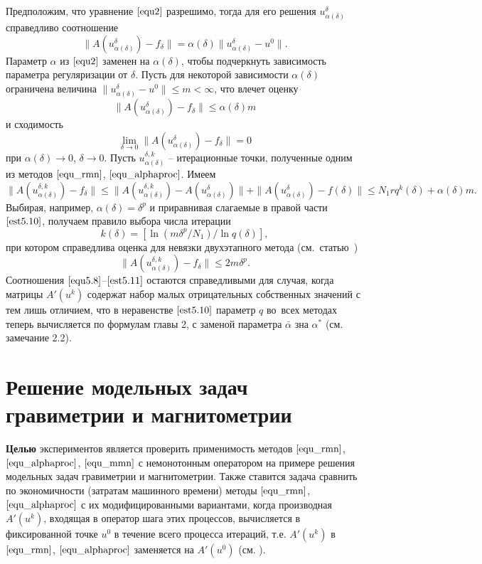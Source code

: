 Предположим, что уравнение $\eqref{equ2}$ разрешимо, тогда для его решения $u_{\alpha(\delta)}^{\delta}$ справедливо соотношение
\begin{equation}\label{equ5.8}
\|A(u_{\alpha(\delta)}^{\delta})-f_\delta\|=\alpha(\delta)\|u_{\alpha(\delta)}^{\delta}-u^0\|.
\end{equation}
Параметр $\alpha$ из $\eqref{equ2}$ заменен на $\alpha(\delta)$, чтобы подчеркнуть зависимость параметра регуляризации от $\delta$.
Пусть для некоторой зависимости $\alpha(\delta)$ ограничена величина $\|u_{\alpha(\delta)}^{\delta}-u^0\|\le m <\infty$, что влечет оценку
\begin{equation}\label{est5.9}
\|A(u_{\alpha(\delta)}^{\delta})-f_\delta\|\le\alpha(\delta)m
\end{equation}
и сходимость $$\lim_{\delta\to 0}\|A(u_{\alpha(\delta)}^{\delta})-f_\delta\|=0$$ при $\alpha(\delta)\to 0$, $\delta\to 0$. Пусть ${u_{\alpha(\delta)}^{\delta, k}}$ -- итерационные точки, полученные одним из методов $\eqref{equ_rmn}$, $\eqref{equ_alphaproc}$. Имеем
\begin{equation}\label{est5.10}
\|A(u_{\alpha(\delta)}^{\delta, k})-f_\delta\|\le\|A(u_{\alpha(\delta)}^{\delta, k})-A(u_{\alpha(\delta)}^{\delta})\|+\|A(u_{\alpha(\delta)}^{\delta})-f(\delta)\|\le N_1 r q^k(\delta)+\alpha(\delta)m.
\end{equation}
Выбирая, например, $\alpha(\delta)=\delta^p$ и приравнивая слагаемые в правой части $\eqref{est5.10}$, получаем правило выбора числа итерации
$$k(\delta)=\left [\ln(m\delta^p/N_1)/\ln q(\delta)\right ],$$
при котором справедлива оценка для невязки двухэтапного метода (см.~статью~\cite{VasSkur2017})
\begin{equation}\label{est5.11}
\|A(u_{\alpha(\delta)}^{\delta,k})-f_\delta\|\le 2m\delta^p.
\end{equation}
{\remark Соотношения $\eqref{equ5.8}$--$\eqref{est5.11}$ остаются справедливыми для случая, когда матрицы $A'(u^k)$ содержат набор малых отрицательных собственных значений с тем лишь отличием, что в неравенстве $\eqref{est5.10}$ параметр $q$ во~всех методах теперь вычисляется по формулам главы 2, с заменой параметра $\bar\alpha$ зна $\alpha^*$ (см. замечание 2.2).}

\newpage
\section{Решение модельных задач гравиметрии и магнитометрии}

{\bfseries Целью} экспериментов является проверить применимость методов $\eqref{equ_rmn}$, $\eqref{equ_alphaproc}$, $\eqref{equ_mmn}$ с немонотонным оператором на примере решения модельных задач гравиметрии и магнитометрии. Также ставится задача сравнить по экономичности (затратам машинного времени) методы $\eqref{equ_rmn}$, $\eqref{equ_alphaproc}$ с их модифицированными вариантами, когда производная $A'(u^k)$, входящая в оператор шага этих процессов, вычисляется в фиксированной точке $u^0$ в течение всего процесса итераций, т.е. $A'(u^k)$ в $\eqref{equ_rmn}$, $\eqref{equ_alphaproc}$ заменяется на $A'(u^0)$ (см. \cite{Vasin2014, Vasin2016}). 

